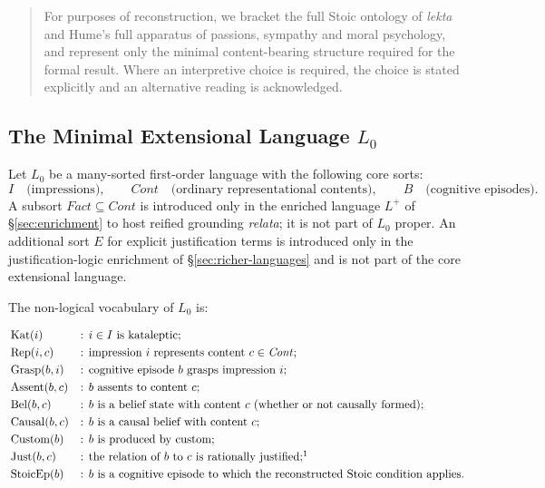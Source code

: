 \begin{quote}
For purposes of reconstruction, we bracket the full Stoic ontology of
\emph{lekta} and Hume's full apparatus of passions, sympathy and
moral psychology, and represent only the minimal content-bearing
structure required for the formal result. Where an interpretive
choice is required, the choice is stated explicitly and an
alternative reading is acknowledged.
\end{quote}

\subsection{The Minimal Extensional Language $L_0$}
\label{sec:l0}

Let $L_0$ be a many-sorted first-order language with the following
core sorts:
\[
I \quad\text{(impressions)},\qquad
\mathit{Cont} \quad\text{(ordinary representational contents)},\qquad
B \quad\text{(cognitive episodes)}.
\]
A subsort $\mathit{Fact} \subseteq \mathit{Cont}$ is introduced only in
the enriched language $L^+$ of \S\ref{sec:enrichment} to host
reified grounding \emph{relata}; it is not part of $L_0$ proper.
An additional sort $E$ for explicit justification terms is introduced
only in the justification-logic enrichment of
\S\ref{sec:richer-languages} and is not part of the core extensional
language.

The non-logical vocabulary of $L_0$ is:

\begin{align*}
&\operatorname{Kat}(i)
&&\text{: $i\in I$ is kataleptic;} \\
&\operatorname{Rep}(i,c)
&&\text{: impression $i$ represents content $c\in\mathit{Cont}$;} \\
&\operatorname{Grasp}(b,i)
&&\text{: cognitive episode $b$ grasps impression $i$;} \\
&\operatorname{Assent}(b,c)
&&\text{: $b$ assents to content $c$;} \\
&\operatorname{Bel}(b,c)
&&\text{: $b$ is a belief state with content $c$ (whether or not
causally formed);} \\
&\operatorname{Causal}(b,c)
&&\text{: $b$ is a causal belief with content $c$;} \\
&\operatorname{Custom}(b)
&&\text{: $b$ is produced by custom;} \\
&\operatorname{Just}(b,c)
&&\text{: the relation of $b$ to $c$ is rationally
justified;}\footnotemark \\
&\operatorname{StoicEp}(b)
&&\text{: $b$ is a cognitive episode to which the reconstructed
Stoic condition applies.}
\end{align*}

